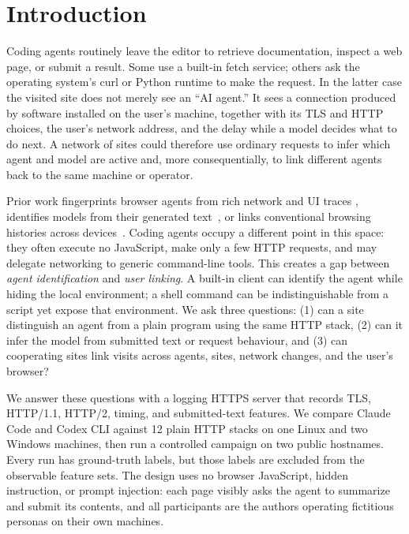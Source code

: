 \section{Introduction}
\label{sec:intro}

Coding agents routinely leave the editor to retrieve documentation, inspect a web page, or submit a
result.  Some use a built-in fetch service; others ask the operating system's curl or Python runtime
to make the request.  In the latter case the visited site does not merely see an ``AI agent.''  It
sees a connection produced by software installed on the user's machine, together with its TLS and
HTTP choices, the user's network address, and the delay while a model decides what to do next.  A
network of sites could therefore use ordinary requests to infer which agent and model are active and,
more consequentially, to link different agents back to the same machine or operator.

Prior work fingerprints browser agents from rich network and UI traces
\cite{kang2026whose,lugoloobi2026actions,wang2026fpagent,fayolle2026browser}, identifies models from
their generated text~\cite{pasquini2025llmmap,sun2025idiosyncrasies}, or links conventional browsing
histories across devices~\cite{zimmeck2017crossdevice,bird2020replication}.  Coding agents occupy a
different point in this space: they often execute no JavaScript, make only a few HTTP requests, and
may delegate networking to generic command-line tools.  This creates a gap between \emph{agent
identification} and \emph{user linking}.  A built-in client can identify the agent while hiding the
local environment; a shell command can be indistinguishable from a script yet expose that
environment.  We ask three questions: (1) can a site distinguish an agent from a plain program using
the same HTTP stack, (2) can it infer the model from submitted text or request behaviour, and (3) can
cooperating sites link visits across agents, sites, network changes, and the user's browser?

We answer these questions with a logging HTTPS server that records TLS, HTTP/1.1, HTTP/2, timing, and
submitted-text features.  We compare Claude Code and Codex CLI against 12 plain HTTP stacks on one
Linux and two Windows machines, then run a controlled campaign on two public hostnames.  Every run
has ground-truth labels, but those labels are excluded from the observable feature sets.  The design
uses no browser JavaScript, hidden instruction, or prompt injection: each page visibly asks the agent
to summarize and submit its contents, and all participants are the authors operating fictitious
personas on their own machines.

